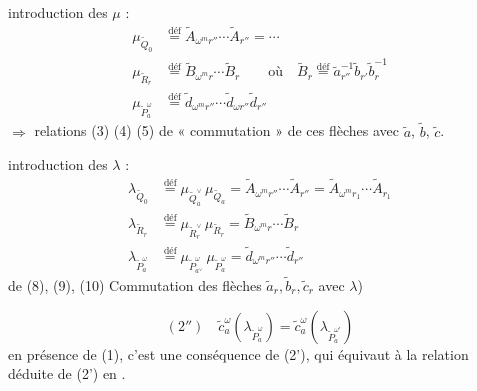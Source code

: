 \documentclass[11pt,a4paper]{article}
\begin{document}
introduction des $\mu$ :
\[
\begin{aligned}
\mu_{\widetilde{Q}_0} &\overset{\text{déf}}{=} \widetilde{A}_{\omega^m r''}\cdots\widetilde{A}_{r''} = \cdots\\
\mu_{\widetilde{R}_r} &\overset{\text{déf}}{=} \widetilde{B}_{\omega^m r}\cdots\widetilde{B}_r
\qquad\text{où}\quad \widetilde{B}_r \overset{\text{déf}}{=} \tilde a_{r''}^{-1}\tilde b_{r'}\tilde b_r^{-1}\\
\mu_{\widetilde{P}^\omega_a} &\overset{\text{déf}}{=} \tilde d_{\omega^m r''}\cdots\tilde d_{\omega r''}\tilde d_{r''}
\end{aligned}
\]
$\Longrightarrow$ relations (3) (4) (5) de « commutation » de ces flèches avec $\tilde a$, $\tilde b$, $\tilde c$.

introduction des $\lambda$ :
\[
\begin{aligned}
\lambda_{\widetilde{Q}_0} &\overset{\text{déf}}{=} \mu_{\widetilde{Q}_a^\vee}\,\mu_{\widetilde{Q}_a} = \widetilde{A}_{\omega^m r''}\cdots\widetilde{A}_{r''} = \widetilde{A}_{\omega^m r_1}\cdots\widetilde{A}_{r_1}\\
\lambda_{\widetilde{R}_r} &\overset{\text{déf}}{=} \mu_{\widetilde{R}_r^\vee}\,\mu_{\widetilde{R}_r} = \widetilde{B}_{\omega^m r}\cdots\widetilde{B}_r\\
\lambda_{\widetilde{P}^\omega_a} &\overset{\text{déf}}{=} \mu_{\widetilde{P}^\omega_{a^\vee}}\,\mu_{\widetilde{P}^\omega_a} = \tilde d_{\omega^m r''}\cdots\tilde d_{r''}
\end{aligned}
\]
 de  (8), (9), (10) \ill{} \quad Commutation des flèches $\tilde a_r, \tilde b_r, \tilde c_r$ avec \ill{} $\lambda$)

\[
(2'')\quad \tilde c^\omega_a(\lambda_{\widetilde{P}^\omega_a}) = \tilde c^\omega_a(\lambda_{\widetilde{P}^{\omega'}_a})
\]
en présence de (1), c'est une conséquence de (2'), qui équivaut à la relation déduite de (2') en .


\end{document}

